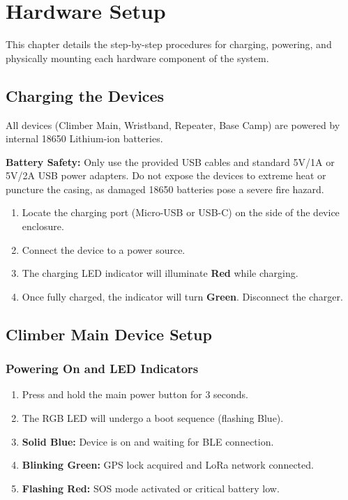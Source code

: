 \chapter{Hardware Setup}
\label{ch:hardware_setup}

This chapter details the step-by-step procedures for charging, powering, and physically mounting each hardware component of the system.

\section{Charging the Devices}
All devices (Climber Main, Wristband, Repeater, Base Camp) are powered by internal 18650 Lithium-ion batteries. 

\begin{warningbox}
\textbf{Battery Safety:} Only use the provided USB cables and standard 5V/1A or 5V/2A USB power adapters. Do not expose the devices to extreme heat or puncture the casing, as damaged 18650 batteries pose a severe fire hazard.
\end{warningbox}

\begin{enumerate}
    \item Locate the charging port (Micro-USB or USB-C) on the side of the device enclosure.
    \item Connect the device to a power source.
    \item The charging LED indicator will illuminate \textbf{Red} while charging.
    \item Once fully charged, the indicator will turn \textbf{Green}. Disconnect the charger.
\end{enumerate}

\section{Climber Main Device Setup}

\subsection{Powering On and LED Indicators}
\begin{enumerate}
    \item Press and hold the main power button for 3 seconds.
    \item The RGB LED will undergo a boot sequence (flashing Blue).
    \item \textbf{Solid Blue:} Device is on and waiting for BLE connection.
    \item \textbf{Blinking Green:} GPS lock acquired and LoRa network connected.
    \item \textbf{Flashing Red:} SOS mode activated or critical battery low.
\end{enumerate}

